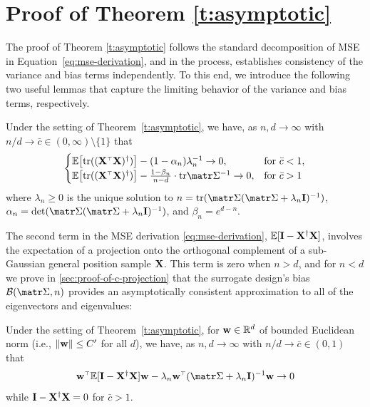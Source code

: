 \documentclass[../../thesis.tex]{subfiles}
\begin{document}
\section{Proof of Theorem \ref{t:asymptotic}}
\label{sec:proof-of-t-asymptotic}

The proof of Theorem \ref{t:asymptotic} follows the standard decomposition of
MSE in Equation~\ref{eq:mse-derivation}, and in the process,
establishes consistency of the variance and bias terms
independently. To this end, we introduce the following two useful
lemmas that capture the limiting behavior of the
variance and bias terms, respectively.

\begin{lemma}\label{c:wishart}
  Under the setting of Theorem~\ref{t:asymptotic}, we have, as $n,d \to \infty$
  with $n/d \to \bar c \in (0, \infty) \setminus \{ 1 \}$ that
  \begin{align}
    \begin{cases}
      \E\big[\tr((\X^\top \X)^\dagger)\big] - (1-\alpha_n) \lambda_n^{-1} \to 0,                    & \text{for }\bar c < 1, \\
      \E\big[\tr((\X^\top \X)^\dagger)\big] - \frac{1-\beta_n}{n - d} \cdot \tr \Sigmab^{-1} \to 0, & \text{for }\bar c > 1
    \end{cases}
    \label{eq:wishart}
  \end{align}
  where $\lambda_n\geq 0$ is the unique solution to
  $n=\tr(\Sigmab(\Sigmab+\lambda_n\I)^{-1})$,
  $\alpha_n=\det(\Sigmab(\Sigmab+\lambda_n\I)^{-1})$,
  and $\beta_n = e^{d-n}$.
\end{lemma}

\noindent

The second term in the MSE derivation \eqref{eq:mse-derivation}, $\mathbb E[\mathbf I -
    \mathbf X^\dag \mathbf X]$, involves the expectation of a projection onto the orthogonal
complement of a sub-Gaussian general position sample $\mathbf X$.
This term is zero when $n > d$, and for $n < d$
we prove in \cref{sec:proof-of-c-projection} that the surrogate design's
bias $\mathcal{B}(\Sigmab, n)$ provides an asymptotically consistent approximation
to all of the eigenvectors and eigenvalues:

\begin{lemma}\label{c:projection}
  Under the setting of Theorem~\ref{t:asymptotic}, for $\mathbf w \in \mathbb R^d$ of bounded Euclidean norm (i.e., $\| \mathbf w \| \le C'$ for all $d$), we have, as $n,d \to \infty$ with $n/d \to \bar c \in (0,1)$ that
  \begin{align}
    \w^\top\E[\I-\X^\dagger\X]\w - \lambda_n \w^\top (\Sigmab + \lambda_n \I)^{-1}\w \to 0
    \label{eq:projection}
  \end{align}
  while $\mathbf I - \mathbf X^\dagger \mathbf X = 0$ for $\bar c > 1$.
\end{lemma}
\end{document}
